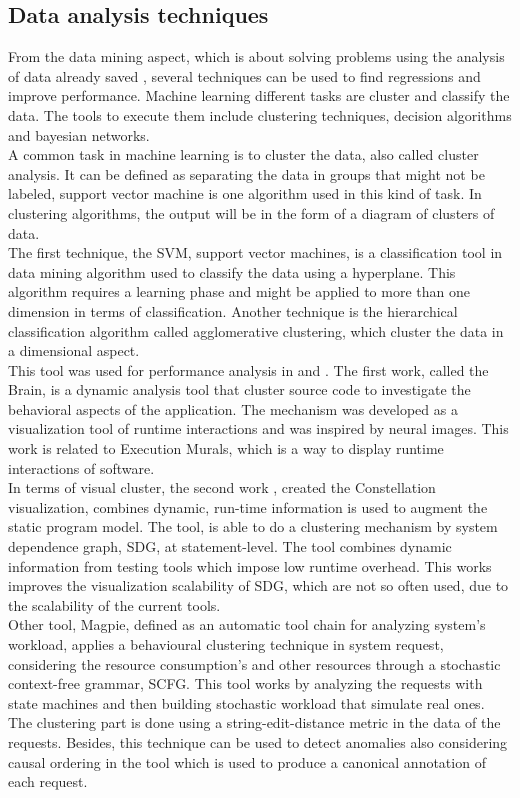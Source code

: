 \subsection{Data analysis techniques}
From the data mining aspect, which is about solving problems using the analysis of data already saved \cite{data_mining_book}, several techniques can be used to find regressions and improve performance.  Machine learning different tasks are cluster and classify the data. The tools to execute them include clustering techniques, decision algorithms and bayesian networks.\\
A common task in machine learning is to cluster the data, also called cluster analysis. It can be defined as separating the data in groups that might not be labeled, support vector machine is one algorithm used in this kind of task. In clustering algorithms, the output will be in the form of a diagram of clusters of data.\\
The first technique, the SVM, support vector machines, is a classification tool in data mining algorithm used to classify the data using a hyperplane. This algorithm requires a learning phase and might be applied to more than one dimension in terms of classification. Another technique is the hierarchical classification algorithm called agglomerative clustering, which cluster the data in a dimensional aspect.\\
This tool was used for performance analysis in \cite{brain} and \cite{constellation}. The first work\cite{brain}, called the Brain, is a dynamic analysis tool that cluster source code to investigate the behavioral aspects of the application. The mechanism was developed as a visualization tool of runtime interactions and was inspired by neural images. This work is related to Execution Murals, which is a way to display runtime interactions of software.\\
In terms of visual cluster, the second work \cite{constellation}, created the Constellation visualization, combines dynamic, run-time information is used to augment the static program model. The tool, is able to do a clustering mechanism by system dependence graph, SDG, at statement-level. The tool combines dynamic information from testing tools which impose low runtime overhead. This works improves the visualization scalability of SDG, which are not so often used, due to the scalability of the current tools.\\
Other tool, Magpie\cite{magpie}, defined as an automatic tool chain for analyzing system’s workload, applies a behavioural clustering technique in system request, considering the resource consumption's and other resources through a stochastic context-free grammar, SCFG. This tool works by analyzing the requests with state machines and then building stochastic workload that simulate real ones. The clustering part is done using a string-edit-distance metric in the data of the requests. Besides, this technique can be used to detect anomalies also considering causal ordering in the tool which is used to produce a canonical annotation of each request.\\

